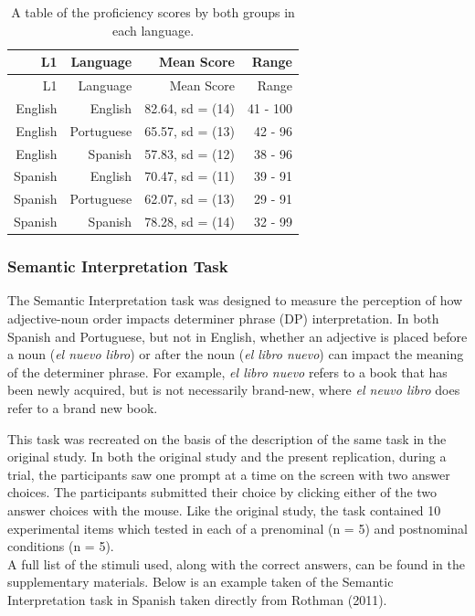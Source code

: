 \documentclass[
  man,floatsintext]{apa6}
\begin{document}
\begin{longtable}[]{@{}rrrr@{}}
\caption{\label{tab:descproftable}A table of the proficiency scores by both groups in each language.}\tabularnewline
\toprule\noalign{}
L1 & Language & Mean Score & Range \\
\midrule\noalign{}
\endfirsthead
\toprule\noalign{}
L1 & Language & Mean Score & Range \\
\midrule\noalign{}
\endhead
\bottomrule\noalign{}
\endlastfoot
English & English & 82.64, sd = (14) & 41 - 100 \\
English & Portuguese & 65.57, sd = (13) & 42 - 96 \\
English & Spanish & 57.83, sd = (12) & 38 - 96 \\
Spanish & English & 70.47, sd = (11) & 39 - 91 \\
Spanish & Portuguese & 62.07, sd = (13) & 29 - 91 \\
Spanish & Spanish & 78.28, sd = (14) & 32 - 99 \\
\end{longtable}

\hypertarget{semantic-interpretation-task}{%
\subsubsection{Semantic Interpretation Task}\label{semantic-interpretation-task}}

The Semantic Interpretation task was designed to measure the perception of how adjective-noun order impacts determiner phrase (DP) interpretation.
In both Spanish and Portuguese, but not in English, whether an adjective is placed before a noun (\emph{el nuevo libro}) or after the noun (\emph{el libro nuevo}) can impact the meaning of the determiner phrase.
For example, \emph{el libro nuevo} refers to a book that has been newly acquired, but is not necessarily brand-new, where \emph{el neuvo libro} does refer to a brand new book.

This task was recreated on the basis of the description of the same task in the original study.
In both the original study and the present replication, during a trial, the participants saw one prompt at a time on the screen with two answer choices.
The participants submitted their choice by clicking either of the two answer choices with the mouse.
Like the original study, the task contained 10 experimental items which tested in each of a prenominal (n = 5) and postnominal conditions (n = 5).\\
A full list of the stimuli used, along with the correct answers, can be found in the supplementary materials.
Below is an example taken of the Semantic Interpretation task in Spanish taken directly from Rothman (2011).
\end{document}
